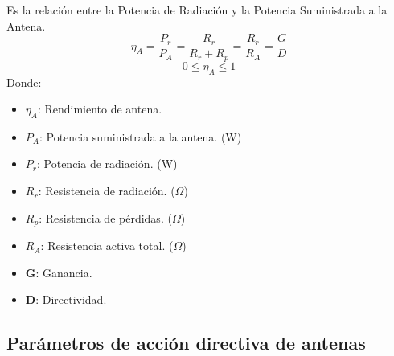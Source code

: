 \documentclass[
	12pt, %
	fleqn, %
	a4paper, %
	oneside, %
]{LegrandOrangeBook}
\begin{document}
\begin{definition}
Es la relación entre la Potencia de Radiación y la Potencia Suministrada a la Antena.
\begin{equation*}
\eta_A=\frac{P_r}{P_A}=\frac{R_r}{R_r+R_p}=\frac{R_r}{R_A}=\frac{G}{D}
\label{eq:rendimiento de antena}
\end{equation*}
\begin{displaymath}
0\leq\eta_A\leq 1
\end{displaymath}
Donde:
\begin{itemize}
\item $\eta_A$: Rendimiento de antena.
\item $P_A$: Potencia suministrada a la antena. (W)
\item $P_r$: Potencia de radiación. (W)
\item $R_r$: Resistencia de radiación. ($\Omega$)
\item $R_p$: Resistencia de pérdidas. ($\Omega$)
\item $R_A$: Resistencia activa total. ($\Omega$)
\item \textbf{G}: Ganancia.
\item \textbf{D}: Directividad.
\end{itemize}
\end{definition}
\subsection{Parámetros de acción directiva de antenas}
\end{document}
